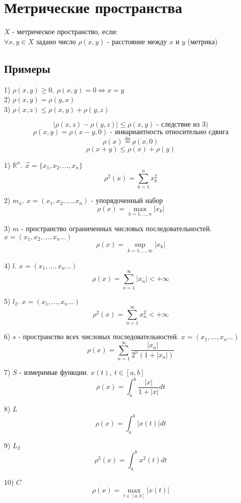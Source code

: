 \documentclass[a4paper]{article}
\theoremstyle{definition}
\theoremstyle{remark}
\begin{document}
\section*{\centering Метрические пространства}
$ X $ - метрическое пространство, если: \\
$ \forall x,y \in X $ задано число $ \rho(x,y) $ - расстояние между $ x $ и $ y $  
(метрика)

\subsection*{Примеры}

1) $ \rho(x,y) \geq 0, \ \rho(x,y) = 0 \iff x = y $\\
2) $ \rho(x,y) = \rho(y,x) $\\
3) $ \rho(x,z) \leq \rho(x,y) + \rho(y,z) $ 

\[
    |\rho(x,z) - \rho(y,z)| \leq \rho(x,y) \text{ - следствие из 3)}
\]
\[
    \rho(x,y) = \rho(x-y, 0) \text{ - инвариантность относительно сдвига}
\]
\[
    \rho(x) \stackrel{\text{dn}}{=} \rho(x,0)
\]
\[
    \rho(x+y) \leq \rho(x) + \rho(y)
\]

1) $ \mathbb{R}^{n} $. $ \vec{x} = \{x_1, x_2, \dots, x_n\} $
\[
    \rho^2(x) = \sum_{k=1}^{n} x^2_k
\]

2) $ m_n $. $ x = (x_1, x_2, \dots, x_n) $ - упорядоченный набор 
\[
    \rho(x) = \max_{k = 1, \dots, n} |x_k|
\]

3) $ m $ - пространство ограниченных числовых последовательностей.
$ x = (x_1, x_2, \dots, x_n \dots) $ 
\[
    \rho(x) = \sup_{k=1, \dots, \infty} |x_k|
\]

4) $ l $. $ x = (x_1, \dots, x_n \dots) $  
\[
    \rho(x) = \sum_{n=1}^{\infty} |x_n| < +\infty
\]

5) $ l_2 $. $ x = (x_1, \dots, x_n \dots) $  
\[
    \rho^2(x) = \sum_{n=1}^{\infty} x^2_n < +\infty
\]

6) $ s $ - пространство всех числовых последовательностей. 
$ x = (x_1, \dots, x_n \dots) $
\[
    \rho(x) = \sum_{n=1}^{\infty} \frac{|x_n|}{2^{n}(1 + |x_n|)} 
\]

7) $ S $ - измеримые функции. $ x(t), \ t \in [a,b] $ 
\[
    \rho(x) = \int_{a}^{b} \frac{|x|}{1+|x|} dt 
\]

8) $ L $ 
\[
    \rho(x) = \int_{a}^{b} |x(t)| dt
\]

9) $ L_2 $ 
\[
    \rho^2(x) = \int_{a}^{b} x^2(t) dt
\]

10) $ C $ 
\[
    \rho(x) = \max_{t \in [a,b]} |x(t)|
\]
\end{document}
